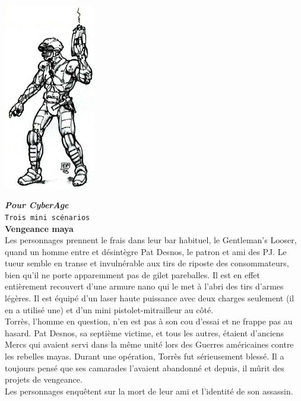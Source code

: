 \documentclass[11pt,twoside,a4paper]{article}
\begin{document}
\begin{multicols*}{3}
\footnotesize{

\includegraphics[width=0.30\textwidth]{img/persoRunnerGun.jpg}

\textbf{\textit{Pour CyberAge}}~\\

\texttt{Trois mini sc{\'e}narios}~\\

\textbf{Vengeance maya}~\\

Les personnages prennent le frais dans leur bar habituel, le Gentleman's Looser, quand un homme entre et d{\'e}sint{\`e}gre Pat Desnos, le patron et ami des PJ. Le tueur semble en transe et invuln{\'e}rable aux tirs de riposte des consommateurs, bien qu'il ne porte apparemment pas de gilet pareballes. Il est en effet enti{\`e}rement recouvert d'une armure nano qui le met {\`a} l'abri des tirs d'armes l{\'e}g{\`e}res. Il est {\'e}quip{\'e} d'un laser haute puissance avec deux charges seulement (il en a utilis{\'e} une) et d'un mini pistolet-mitrailleur au c{\^o}t{\'e}.~\\

Torr{\`e}s, l'homme en question, n'en est pas {\`a} son cou d'essai et ne frappe pas au hasard. Pat Desnos, sa septi{\`e}me victime, et tous les autres, {\'e}taient d'anciens Mercs qui avaient servi dans la m{\^e}me unit{\'e} lors des Guerres am{\'e}ricaines contre les rebelles mayas. Durant une op{\'e}ration, Torr{\`e}s fut s{\'e}rieusement bless{\'e}. Il a toujours pens{\'e} que ses camarades l'avaient abandonn{\'e} et depuis, il m{\^u}rit des projets de vengeance.~\\
Les personnages enqu{\^e}tent sur la mort de leur ami et l'identit{\'e} de son assassin.~\\

}
\end{multicols*}
\end{document}
